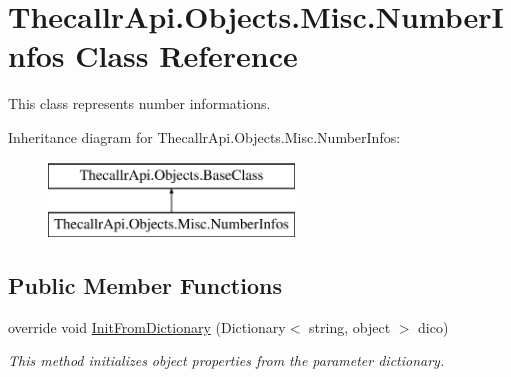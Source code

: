 \hypertarget{class_thecallr_api_1_1_objects_1_1_misc_1_1_number_infos}{\section{Thecallr\+Api.\+Objects.\+Misc.\+Number\+Infos Class Reference}
\label{class_thecallr_api_1_1_objects_1_1_misc_1_1_number_infos}
}


This class represents number informations.  


Inheritance diagram for Thecallr\+Api.\+Objects.\+Misc.\+Number\+Infos\+:\begin{figure}[H]
\begin{center}
\leavevmode
\includegraphics[height=2.000000cm]{class_thecallr_api_1_1_objects_1_1_misc_1_1_number_infos}
\end{center}
\end{figure}
\subsection*{Public Member Functions}
\begin{DoxyCompactItemize}
\item 
override void \hyperlink{class_thecallr_api_1_1_objects_1_1_misc_1_1_number_infos_a987a1e4de5b1af9b2b476dc285573345}{Init\+From\+Dictionary} (Dictionary$<$ string, object $>$ dico)
\begin{DoxyCompactList}\small\item\em This method initializes object properties from the parameter dictionary. \end{DoxyCompactList}\end{DoxyCompactItemize}
